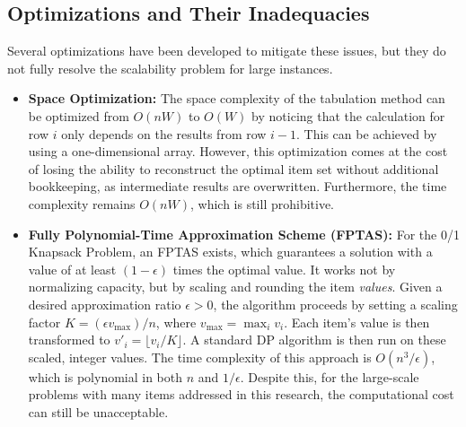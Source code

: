 \subsection{Optimizations and Their Inadequacies}

Several optimizations have been developed to mitigate these issues, but they do not fully resolve the scalability problem for large instances.

\begin{itemize}
    \item \textbf{Space Optimization:} The space complexity of the tabulation method can be optimized from \(O(nW)\) to \(O(W)\) by noticing that the calculation for row \(i\) only depends on the results from row \(i-1\). This can be achieved by using a one-dimensional array. However, this optimization comes at the cost of losing the ability to reconstruct the optimal item set without additional bookkeeping, as intermediate results are overwritten. Furthermore, the time complexity remains \(O(nW)\), which is still prohibitive.

    \item \textbf{Fully Polynomial-Time Approximation Scheme (FPTAS):} For the 0/1 Knapsack Problem, an FPTAS exists, which guarantees a solution with a value of at least \((1-\epsilon)\) times the optimal value. It works not by normalizing capacity, but by scaling and rounding the item \textit{values}. Given a desired approximation ratio \(\epsilon > 0\), the algorithm proceeds by setting a scaling factor \(K = (\epsilon v_{\max}) / n\), where \(v_{\max} = \max_{i} v_i\). Each item's value is then transformed to \(v'_i = \lfloor v_i / K \rfloor\). A standard DP algorithm is then run on these scaled, integer values. The time complexity of this approach is \(O(n^3/\epsilon)\), which is polynomial in both \(n\) and \(1/\epsilon\). Despite this, for the large-scale problems with many items addressed in this research, the computational cost can still be unacceptable.
\end{itemize}
